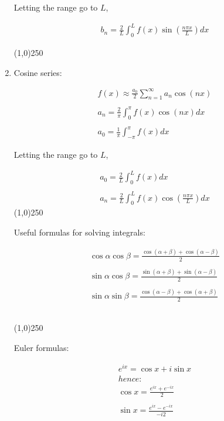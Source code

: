 \documentclass[11pt]{article}
\begin{document}
\begin{enumerate}
Letting the range go to $L$,

\begin{align*}
    b_{n} = \frac{2}{L} \int_{0}^{L} f(x) \sin (\frac{n \pi x}{L}) dx
\end{align*}

\line(1,0){250}

\item 

Cosine series:

\begin{align*}
    f(x) \approx \frac{a_{0}}{2} \sum_{n=1}^{\infty} a_{n} \cos(nx) \\ \\
    a_{n} = \frac{2}{\pi} \int_{0}^{\pi} f(x)\cos(nx) dx \\ \\
    a_{0} = \frac{1}{\pi} \int_{-\pi}^{\pi} f(x) dx
\end{align*}

Letting the range go to $L$,

\begin{align*}
    a_{0} = \frac{2}{L} \int_{0}^{L} f(x) dx \\\\
    a_{n} = \frac{2}{L} \int_{0}^{L} f(x) \cos(\frac{n \pi x}{L})dx
\end{align*}
\line(1,0){250}
\newpage

Useful formulas for solving integrals:

\begin{align*}
    \cos\alpha \cos\beta = \frac{\cos(\alpha + \beta)+\cos(\alpha - \beta)}{2} \\ \\
    \sin\alpha \cos\beta = \frac{\sin(\alpha + \beta)+\sin(\alpha - \beta)}{2} \\\\
    \sin\alpha \sin\beta = \frac{\cos(\alpha - \beta)+\cos(\alpha + \beta)}{2} \\\\\\
\end{align*}

\line(1,0){250}
\newpage

Euler formulas:

\begin{align*}
     e^{ix}=\cos x + i\sin x  \\
	hence: \\
     \cos x = \frac{e^{ix} + e^{-ix}}{2}\\\\
     \sin x = \frac{e^{ix} - e^{-ix}}{-i2}\\\\
\end{align*}


\end{enumerate}
\end{document}
